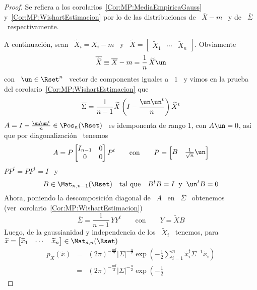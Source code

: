 \begin{proof}
  Se      refiera      a     los      corolarios~\ref{Cor:MP:MediaEmpiricaGauss}
  y~\ref{Cor:MP:WishartEstimacion}   por   lo  de   las   distribuciones  de   \
  $\overline{X}-m$ \ y de \ $\overline{\Sigma}$ \ respectivamente.

  A continuaci\'on,  sean \  $\widetilde{X}_i =  X_i - m$  \ y  \ $\widetilde{X}
  =        \begin{bmatrix}        \widetilde{X}_1        &       \cdots        &
    \widetilde{X}_n \end{bmatrix}$. Obviamente
  \[
  \overline{\widetilde{X}} \equiv \overline{X} - m = \frac{1}{n} \, \widetilde{X} \un
  \]
  con \ $\un \in  \Rset^n$ \ vector de componentes iguales a \  $1$ \ y vimos en
  la prueba del corolario~\ref{Cor:MP:WishartEstimacion} que
  \[
  \overline{\Sigma} = \frac{1}{n-1} \widetilde{X} \left( I - \frac{\un \un^t}{n}
  \right) \widetilde{X}^t
  \]
  $A = I - \frac{\un \un^t}{n} \in  \Pos_n(\Rset)$ \ es idemponenta de rango 1, con
  $A  \un = 0$,  as\'i que  por diagonalizaci\'on~\cite{HorJoh13,  Bat97, Bat07}
  tenemos
  \[
  A = P \begin{bmatrix} I_{n-1} & 0\\ 0 & 0 \end{bmatrix} P^t \qquad \mbox{con} \qquad
  P = \begin{bmatrix} B & \frac{1}{\sqrt{n}} \un \end{bmatrix}
  \]
  $P P^t = P P^t = I$ \ y
  \[
  B \in \Mat_{n,n-1}(\Rset) \quad \mbox{tal que} \quad  B^t B = I \: \mbox{ y } \:
  \un^t B = 0
  \]
  Ahora,   poniendo   la  descomposici\'on   diagonal   de   \   $A$  \   en   \
  $\overline{\Sigma}$ \ obtenemos (ver~corolario~\ref{Cor:MP:WishartEstimacion})
  \[
  \overline{\Sigma} = \frac{1}{n-1} \, Y Y^t \qquad \mbox{con} \qquad Y = \widetilde{X} B
  \]
  Luego, de la gaussianidad y independencia de los \ $\widetilde{X}_i$ \ tenemos,
  para \   $\widetilde{x}   =    \begin{bmatrix}   \widetilde{x}_1   &   \cdots   &
    \widetilde{x}_n \end{bmatrix} \in \Mat_{d,n}(\Rset)$
  \begin{eqnarray*}
  p_{\widetilde{X}}(\widetilde{x}) & = & (2 \pi)^{-\frac{n d}{2}}
  |\Sigma|^{-\frac{n}{2}} \exp\left(- \frac12 \sum_{i=1}^n \widetilde{x}_i^t
  \Sigma^{-1} \widetilde{x}_i \right)\\[2mm]
  & = & (2 \pi)^{-\frac{n d}{2}} |\Sigma|^{-\frac{n}{2}} \exp\left(- \frac12

\end{eqnarray*}
\end{proof}
